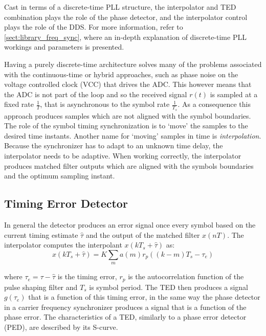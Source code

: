 Cast in terms of a discrete-time PLL structure, the interpolator and TED combination plays the role of the phase detector, and the interpolator control plays the role of the DDS. For more information, refer to \autoref{sect:library_freq_sync}, where an in-depth explanation of discrete-time PLL workings and parameters is presented.

Having a purely discrete-time architecture solves many of the problems associated with the continuous-time or hybrid approaches, such as phase noise on the voltage controlled clock (VCC) that drives the ADC. This however means that the ADC is not part of the loop and so the received signal $r(t)$ is sampled at a fixed rate $\frac{1}{T}$, that is asynchronous to the symbol rate $\frac{1}{T_s}$. As a consequence this approach produces samples which are not aligned with the symbol boundaries. The role of the symbol timing synchronization is to `move' the samples to the desired time instants. Another name for `moving' samples in time is \emph{interpolation}. Because the synchronizer has to adapt to an unknown time delay, the interpolator needs to be adaptive. When working correctly, the interpolator produces matched filter outputs which are aligned with the symbols boundaries and the optimum sampling instant.

\subsection{Timing Error Detector}
\label{sect:timing_error_detector}

In general the detector produces an error signal once every symbol based on the current timing estimate $\hat \tau$ and the output of the matched filter $x(nT)$. The interpolator computes the interpolant $x(kT_s+\hat \tau)$ as:
\begin{equation}
x(kT_s+\hat\tau) = K\sum_{m} a(m)r_p\left(\left(k-m\right)T_s-\tau_e\right)
\end{equation}

where $\tau_e=\tau-\hat\tau$ is the timing error, $r_p$ is the autocorrelation function of the pulse shaping filter and $T_s$ is symbol period. The TED then produces a signal $g(\tau_e)$ that is a function of this timing error, in the same way the phase detector in a carrier frequency synchronizer produces a signal that is a function of the phase error. The characteristics of a TED, similarly to a phase error detector (PED), are described by its S-curve.

